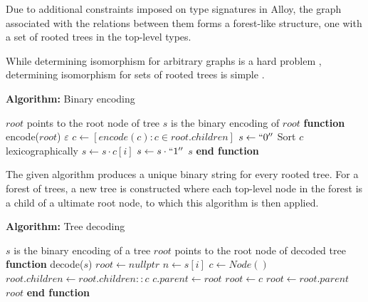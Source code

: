 \documentclass[conference]{IEEEtran}
\begin{document}
    Due to additional constraints imposed on type signatures in Alloy, the graph associated with the relations between them forms a forest-like structure, one with a set of rooted trees \cite{jackson-reference}
    in the top-level types.
    
    While determining isomorphism for arbitrary graphs is a hard problem \cite{graph-isomorphism}, determining isomorphism for sets of rooted trees is simple \cite{AHU}.

    \newcommand{\FUNCTION}[2]{\STATE \textbf{function} #1(#2)}
    \newcommand{\ENDFUNCTION}{\STATE \textbf{end function}}

    \begin{center}
        \textbf{Algorithm:} Binary encoding
        \end{center}
        \begin{algorithmic}[1]  %
        \REQUIRE $root$ points to the root node of tree
        \ENSURE $s$ is the binary encoding of $root$
        \FUNCTION{encode}{$root$}
            \RETURN $\varepsilon$
        \ENDIF 
        \STATE $c \gets [encode(c) : c \in root.children]$
        \STATE $s \gets ``0''$
        \STATE Sort $c$ lexicographically
        \STATE $s \gets s \cdot c[i]$
        \ENDFOR
        \STATE $s \gets s \cdot ``1''$
        \RETURN $s$
        \ENDFUNCTION
        \end{algorithmic}

The given algorithm produces a unique binary string for every rooted tree. For a forest of trees, a new tree is constructed where each top-level node in the forest is a child of a ultimate root node, to which this algorithm is then applied.

\begin{center}
    \textbf{Algorithm:} Tree decoding
    \end{center}
    \begin{algorithmic}[1]  %
    \ENSURE $s$ is the binary encoding of a tree
    \REQUIRE $root$ points to the root node of decoded tree
    \FUNCTION{decode}{$s$}
    \STATE $root \gets nullptr$
        \STATE $n \gets s[i]$
        \STATE $c \gets Node()$
            \STATE $root.children \gets root.children::c$
        \ENDIF
        \STATE $c.parent \gets root$
        \STATE $root \gets c$
        \ELSE
        \STATE $root \gets root.parent$
        \ENDIF
    \ENDFOR
    \RETURN $root$
    \ENDFUNCTION
    \end{algorithmic}
\end{document}
